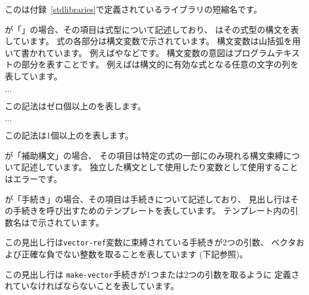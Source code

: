 このは付録~\ref{stdlibraries}で定義されているライブラリの短縮名です。

が「\exprtype」の場合、その項目は式型について記述しており、
はその式型の構文を表しています。
式の各部分は構文変数で示されています。
構文変数は山括弧を用いて書かれています。
例えばやなどです。
構文変数の意図はプログラムテキストの部分を表すことです。
例えばは構文的に有効な式となる任意の文字の列を表しています。
\begin{tabbing}
\qquad {} $\ldots$
\end{tabbing}
この記法はゼロ個以上のを表します。
\begin{tabbing}
\qquad {}  $\ldots$
\end{tabbing}
この記法は1個以上のを表します。

が「補助構文」の場合、
その項目は特定の式の一部にのみ現れる構文束縛について記述しています。
独立した構文として使用したり変数として使用することはエラーです。

が「手続き」の場合、その項目は手続きについて記述しており、
見出し行はその手続きを呼び出すためのテンプレートを表しています。
テンプレート内の引数名はで示されています。

\noindent{}\unpenalty

この見出し行は{\tt vector-ref}変数に束縛されている手続きが2つの引数、
ベクタおよび正確な負でない整数を取ることを表しています
(下記参照)。

\noindent%
\unpenalty

この見出し行は
{\tt make-vector}手続きが1つまたは2つの引数を取るように
定義されていなければならないことを表しています。

